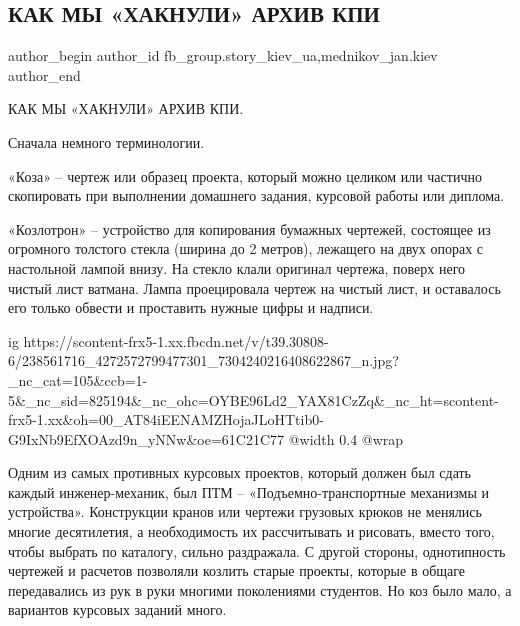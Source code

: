  
 
 
 
 
 
\subsection{КАК МЫ «ХАКНУЛИ» АРХИВ КПИ}
\label{sec:14_08_2021.fb.fb_group.story_kiev_ua.1.haknuli_arhiv_kpi}
 
\ifcmt
 author_begin
   author_id fb_group.story_kiev_ua,mednikov_jan.kiev
 author_end
\fi

КАК МЫ «ХАКНУЛИ» АРХИВ КПИ.

Сначала немного терминологии.

«Коза» – чертеж или образец проекта, который можно целиком или частично
скопировать при выполнении домашнего задания, курсовой работы или диплома.

«Козлотрон» – устройство для копирования бумажных чертежей, состоящее из
огромного толстого стекла (ширина до 2 метров), лежащего на двух опорах с
настольной лампой внизу. На стекло клали оригинал чертежа, поверх него чистый
лист ватмана. Лампа проецировала чертеж на чистый лист, и оставалось его только
обвести и проставить нужные цифры и надписи.

\ifcmt
  ig https://scontent-frx5-1.xx.fbcdn.net/v/t39.30808-6/238561716_4272572799477301_7304240216408622867_n.jpg?_nc_cat=105&ccb=1-5&_nc_sid=825194&_nc_ohc=OYBE96Ld2_YAX81CzZq&_nc_ht=scontent-frx5-1.xx&oh=00_AT84iEENAMZHojaJLoHTtib0-G9IxNb9EfXOAzd9n_yNNw&oe=61C21C77
  @width 0.4
  @wrap 
\fi


Одним из самых противных курсовых проектов, который должен был сдать каждый
инженер-механик, был ПТМ – «Подъемно-транспортные механизмы и устройства».
Конструкции кранов или чертежи грузовых крюков не менялись многие десятилетия,
а необходимость их рассчитывать и рисовать, вместо того, чтобы выбрать по
каталогу, сильно раздражала. С другой стороны, однотипность чертежей и расчетов
позволяли козлить старые проекты, которые в общаге передавались из рук в руки
многими поколениями студентов. Но коз было мало, а вариантов курсовых заданий
много.

